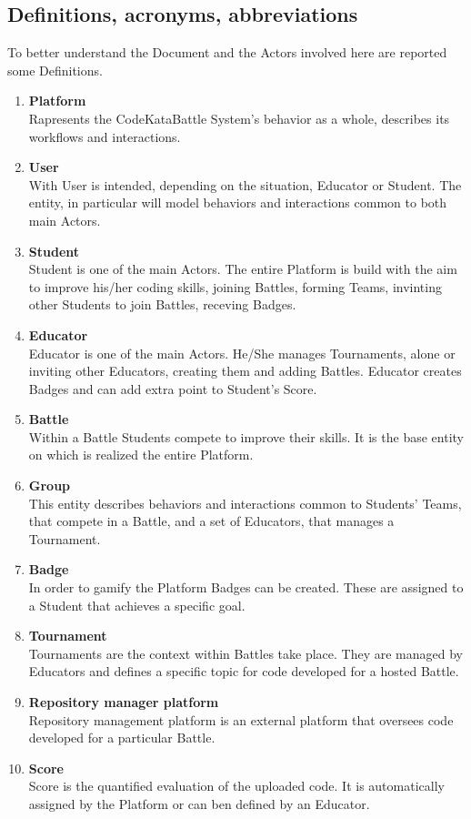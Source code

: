 \subsection{Definitions, acronyms, abbreviations}
To better understand the Document and the Actors involved here are reported some Definitions.
\begin{enumerate}[label=$\bullet$]
    \item \textbf{Platform}\\Rapresents the CodeKataBattle System's behavior as a whole, describes its workflows and interactions.
    \item \textbf{User}\\With User is intended, depending on the situation, Educator or Student. The entity, in particular will model behaviors and interactions common to both main Actors.
    \item \textbf{Student}\\Student is one of the main Actors. The entire Platform is build with the aim to improve his/her coding skills, joining Battles, forming Teams, invinting other Students to join Battles, receving Badges.
    \item \textbf{Educator}\\Educator is one of the main Actors. He/She manages Tournaments, alone or inviting other Educators, creating them and adding Battles. Educator creates Badges and can add extra point to Student's Score.
    \item \textbf{Battle}\\Within a Battle Students compete to improve their skills. It is the base entity on which is realized the entire Platform.
    \item \textbf{Group}\\This entity describes behaviors and interactions common to Students' Teams, that compete in a Battle, and a set of Educators, that manages a Tournament.
    \item \textbf{Badge}\\In order to gamify the Platform Badges can be created. These are assigned to a Student that achieves a specific goal.
    \item \textbf{Tournament}\\Tournaments are the context within Battles take place. They are managed by Educators and defines a specific topic for code developed for a hosted Battle.
    \item \textbf{Repository manager platform}\\Repository management platform is an external platform that oversees code developed for a particular Battle.
    \item \textbf{Score}\\Score is the quantified evaluation of the uploaded code. It is automatically assigned by the Platform or can ben defined by an Educator.
\end{enumerate}
